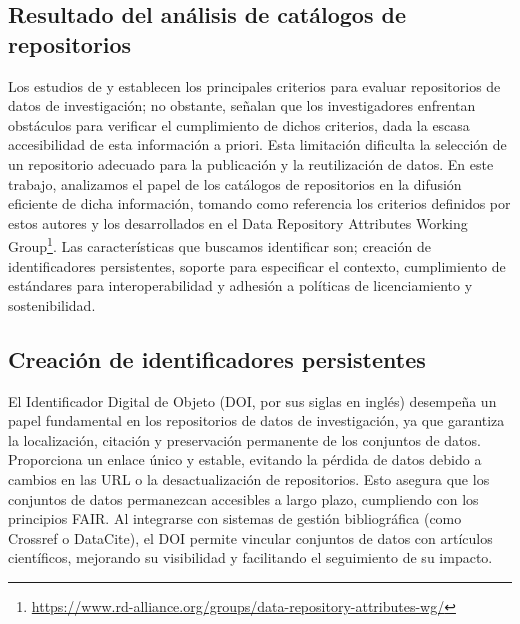 \documentclass[runningheads]{llncs}
\begin{document}
\subsection{Resultado del análisis de catálogos de repositorios}
Los estudios de \citep{witt_2024_11221855} y \citep{Jia25} establecen los principales criterios para evaluar repositorios de datos de investigación; no obstante, señalan que los investigadores enfrentan obstáculos para verificar el cumplimiento de dichos criterios, dada la escasa accesibilidad de esta información a priori. Esta limitación dificulta la selección de un repositorio adecuado para la publicación y la reutilización de datos. En este trabajo, analizamos el papel de los catálogos de repositorios en la difusión eficiente de dicha información, tomando como referencia los criterios definidos por estos autores y los desarrollados en el Data Repository Attributes Working Group\footnote{\url{https://www.rd-alliance.org/groups/data-repository-attributes-wg/}}.
Las características que buscamos identificar son; creación de identificadores persistentes, soporte para especificar el contexto, cumplimiento de estándares para interoperabilidad y adhesión a políticas de licenciamiento y sostenibilidad.

\subsection*{Creación de identificadores persistentes} 

El Identificador Digital de Objeto (DOI, por sus siglas en inglés) desempeña un papel fundamental en los repositorios de datos de investigación, ya que garantiza la localización, citación y preservación permanente de los conjuntos de datos. Proporciona un enlace único y estable, evitando la pérdida de datos debido a cambios en las URL o la desactualización de repositorios. Esto asegura que los conjuntos de datos permanezcan accesibles a largo plazo, cumpliendo con los principios FAIR. Al integrarse con sistemas de gestión bibliográfica (como Crossref o DataCite), el DOI permite vincular conjuntos de datos con artículos científicos, mejorando su visibilidad y facilitando el seguimiento de su impacto.
\end{document}
